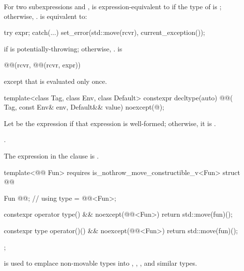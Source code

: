 \pnum
For two subexpressions  and ,
 is expression-equivalent to
if the type of  is ;
otherwise, .
 is equivalent to:
\begin{codeblock}
try {
  expr;
} catch(...) {
  set_error(std::move(rcvr), current_exception());
}
\end{codeblock}
if  is potentially-throwing; otherwise, .
 is
\begin{codeblock}
@@(rcvr, @@(rcvr, expr))
\end{codeblock}
except that  is evaluated only once.

\begin{itemdecl}
template<class Tag, class Env, class Default>
  constexpr decltype(auto) @@(
    Tag, const Env& env, Default&& value) noexcept(@\seebelow@);
\end{itemdecl}

\begin{itemdescr}
\pnum
Let  be the expression 
if that expression is well-formed;
otherwise, it is .

\pnum
\returns
{}.

\pnum
\remarks
The expression in the  clause is .
\end{itemdescr}

\pnum
\begin{codeblock}
template<@@ Fun>
  requires is_nothrow_move_constructible_v<Fun>
struct @@ {
  Fun @@;                                                      // \expos
  using type = @@<Fun>;

  constexpr operator type() && noexcept(@@<Fun>) {
    return std::move(fun)();
  }

  constexpr type operator()() && noexcept(@@<Fun>) {
    return std::move(fun)();
  }
};
\end{codeblock}
\begin{note}
 is used to emplace non-movable types
into , , , and similar types.
\end{note}

